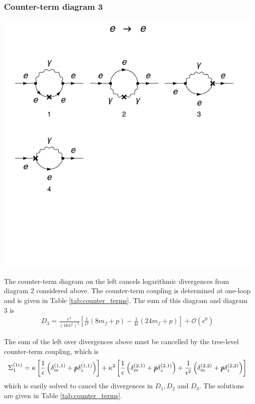 \documentclass[11pt]{article}
\begin{document}
\subsubsection{Counter-term diagram 3}
\noindent\begin{minipage}{0.3\textwidth}
\begin{center}
\includegraphics{QED_F_2loop_4c.pdf}
\end{center}
\end{minipage}
\noindent\begin{minipage}{0.7\textwidth}
The counter-term diagram on the left cancels logarithmic divergences from diagram 2 considered above.  The counter-term coupling is determined at one-loop and is given in Table \ref{tab:counter_terms}.   The sum of this diagram and diagram 3 is
\begin{align}
D_3 = \frac{e^4}{(16\pi^2)^2} \left[ \frac{1}{\epsilon^2}(8m_f+p)-\frac{1}{4\epsilon}(24m_f+p)\right]+\mathcal{O}(\epsilon^0)
\end{align}
\end{minipage}

The sum of the left over divergences above must be cancelled by the tree-level counter-term coupling, which is
\begin{align}
\Sigma_{1}^{(1c)} = \kappa\left[\frac{1}{\epsilon}\left( \delta_{m}^{(1,1)}+ \slashed{p}\delta_{z}^{(1,1)}\right)\right]
+  \kappa^2\left[\frac{1}{\epsilon}\left( \delta_{m}^{(2,1)}+ \slashed{p}\delta_{z}^{(2,1)}\right)+\frac{1}{\epsilon^2}\left( \delta_{m}^{(2,2)}+ \slashed{p}\delta_{z}^{(2,2)}\right)\right]
\end{align}
which is easily solved to cancel the divergences in $D_1,D_2$ and $D_3$.  The solutions are given in Table \ref{tab:counter_terms}.
\end{document}

